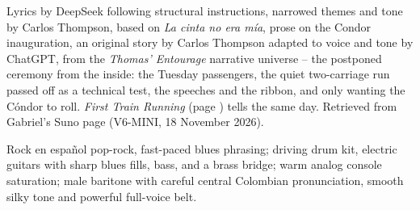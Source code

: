 
\label{sec:ceremonia}
\begin{notes}
Lyrics by DeepSeek following structural instructions, narrowed themes and tone by Carlos Thompson, based on \emph{La cinta no era mía}, prose on the Condor inauguration, an original story by Carlos Thompson adapted to voice and tone by ChatGPT, from the \emph{Thomas' Entourage} narrative universe -- the postponed ceremony from the inside: the Tuesday passengers, the quiet two-carriage run passed off as a technical test, the speeches and the ribbon, and only wanting the Cóndor to roll. \emph{First Train Running} (page \pageref{sec:first-train-running}) tells the same day. Retrieved from Gabriel's Suno page (V6-MINI, 18 November 2026).
\end{notes}
\begin{style}
Rock en español pop-rock, fast-paced blues phrasing; driving drum kit, electric guitars with sharp blues fills, bass, and a brass bridge; warm analog console saturation; male baritone with careful central Colombian pronunciation, smooth silky tone and powerful full-voice belt.
\end{style}
